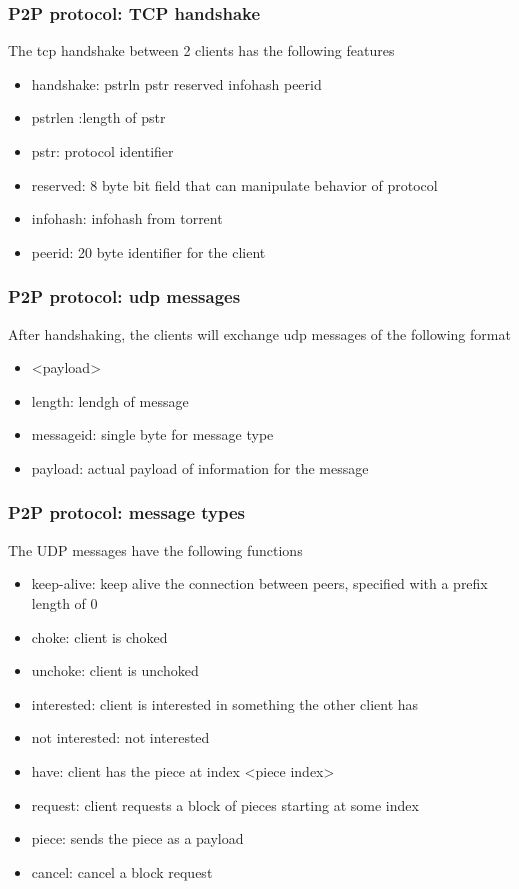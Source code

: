 \documentclass{beamer}
\begin{document}
\begin{frame}
\frametitle{P2P protocol: TCP handshake}
\begin{block}{The tcp handshake between 2 clients has the following features}
\begin{itemize}
\item handshake: pstrln pstr reserved infohash peerid
\item pstrlen :length of pstr
\item pstr: protocol identifier
\item reserved: 8 byte bit field that can manipulate behavior of protocol
\item infohash: infohash from torrent
\item peerid: 20 byte identifier for the client 
\end{itemize}
\end{block}
\end{frame}

\begin{frame}
\frametitle{P2P protocol: udp messages}
\begin{block}{After handshaking, the clients will exchange udp messages of the following format}
\begin{itemize}
\item <length prefix><message id><payload>
\item length: lendgh of message
\item messageid: single byte for message type
\item payload: actual payload of information for the message
\end{itemize}
\end{block}
\end{frame}

\begin{frame}
\frametitle{P2P protocol: message types}
\begin{block}{The UDP messages have the following functions}
\begin{itemize}
\item keep-alive: keep alive the connection between peers, specified with a prefix length of 0
\item choke: client is choked 
\item unchoke: client is unchoked
\item interested: client is interested in something the other client has 
\item not interested: not interested
\item have: client has the piece at index <piece index>
\item request: client requests a block of pieces starting at some index
\item piece: sends the piece as a payload
\item cancel: cancel a block request
\end{itemize}
\end{block}
\end{frame}
\end{document}
